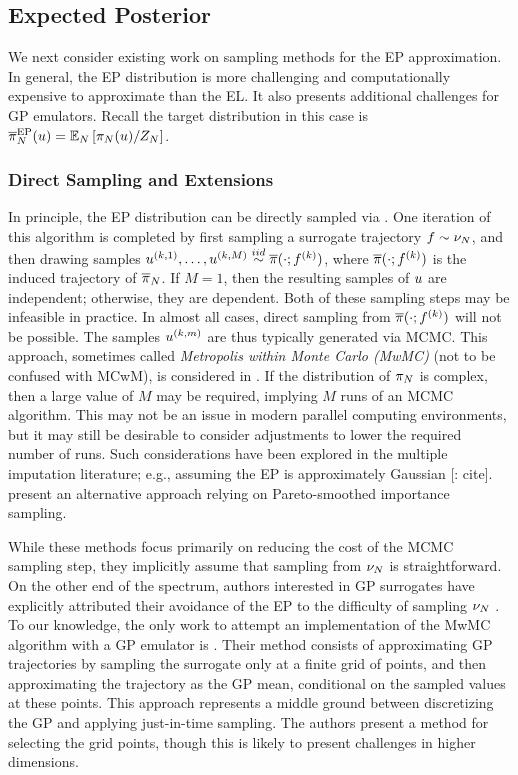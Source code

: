 \documentclass[12pt]{article}
\begin{document}
\subsection{Expected Posterior}
We next consider existing work on sampling methods for the EP approximation. In general, the
EP distribution is more challenging and computationally expensive to approximate than the EL. It also presents
additional challenges for GP emulators. Recall the target distribution in this case is 
$\overline{\pi}_{N}^{\mathrm{EP}}(u) = \mathbb{E}_{N}\left[\pi_{N}(u)/Z_{N} \right]$.

\subsubsection{Direct Sampling and Extensions}
In principle, the EP distribution can be directly sampled via .
One iteration of this algorithm is completed by first sampling 
a surrogate trajectory $f \sim \nu_{N}$, and then 
drawing samples 
$u^{(k, 1)}, \dots, u^{(k, M)} \overset{iid}{\sim} \overline{\pi}(\cdot; f^{(k)})$,
where $\overline{\pi}(\cdot; f^{(k)})$ is the induced trajectory of $\overline{\pi}_{N}$.
If $M = 1$, then the resulting samples of $u$ are independent; otherwise, they are dependent.
Both of these sampling steps may be infeasible in practice. In almost all cases, direct sampling from 
$\overline{\pi}(\cdot; f^{(k)})$ will not be possible. The samples $u^{(k, m)}$ are thus
typically generated via MCMC. This approach, sometimes called \textit{Metropolis within Monte Carlo (MwMC)} 
(not to be confused with MCwM), is considered in \citep{garegnani2021NoisyMCMC,BurknerSurrogate}.
If the distribution of $\pi_{N}$ is complex, then a large value of $M$ may be required, implying 
$M$ runs of an MCMC algorithm. This may not be an issue in modern parallel computing environments, but
it may still be desirable to consider adjustments to lower the required number of runs. Such considerations 
have been explored in the multiple imputation literature; e.g., assuming the EP is approximately Gaussian [\todo: cite].
\citep{BurknerTwoStep} present an alternative approach relying on Pareto-smoothed importance sampling. 
 
While these methods focus primarily on reducing the cost of the MCMC sampling step, they implicitly assume
that sampling from $\nu_{N}$ is straightforward. On the other end of the spectrum, authors interested in GP 
surrogates have explicitly attributed their avoidance of the EP to the difficulty of sampling $\nu_{N}$ 
\citep{VehtariParallelGP,StuartTeck2}. To our knowledge, the only work to attempt an implementation of the 
MwMC algorithm with a GP emulator is \citet{trainDynamics}.
Their method consists of approximating GP 
trajectories by sampling the surrogate only at a finite grid of points, and then approximating 
the trajectory as the GP mean, conditional on the sampled values at these points. This approach represents
a middle ground between discretizing the GP and applying just-in-time sampling. The authors present a method
for selecting the grid points, though this is likely to present challenges in higher dimensions. 
\end{document}

